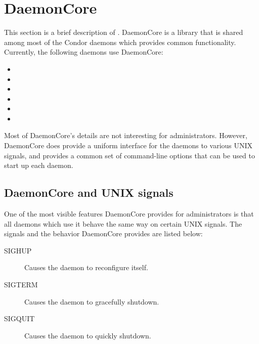 \section{DaemonCore}
\label{sec:DaemonCore}

This section is a brief description of .  DaemonCore
is a library that is shared among most of the Condor daemons which
provides common functionality.  Currently, the following daemons use
DaemonCore:

\begin{itemize}
\item {}
\item {}
\item {}
\item {}
\item {}
\item {}
\end{itemize}

Most of DaemonCore's details are not interesting for administrators.
However, DaemonCore does provide a uniform interface for the daemons
to various UNIX signals, and provides a common set of command-line
options that can be used to start up each daemon.

\subsection{DaemonCore and UNIX signals}
\label{sec:DaemonCore-Signals}

One of the most visible features DaemonCore provides for
administrators is that all daemons which use it behave the same way on
certain UNIX signals.  The signals and the behavior DaemonCore
provides are listed below:

\begin{description}
\item[SIGHUP] Causes the daemon to reconfigure itself.
\item[SIGTERM] Causes the daemon to gracefully shutdown.
\item[SIGQUIT] Causes the daemon to quickly shutdown.
\end{description}

